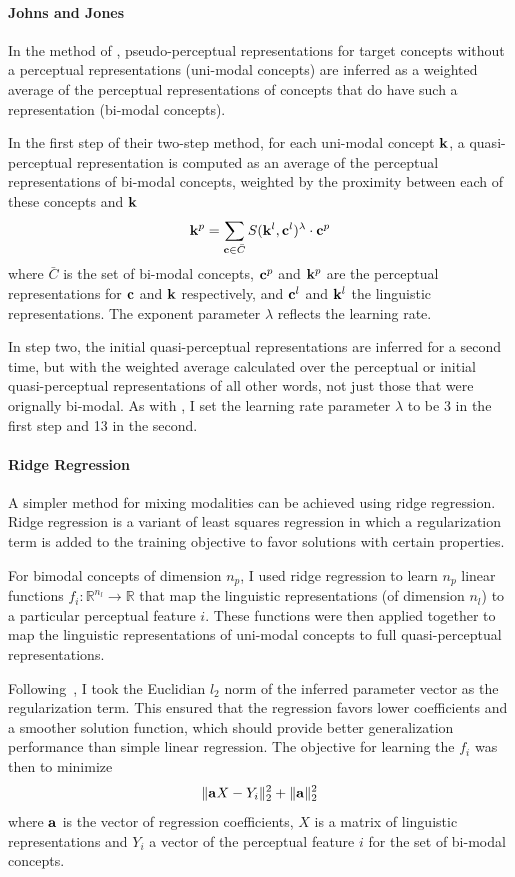 \paragraph{Johns and Jones} In the method of \cite{johns2012perceptual}, pseudo-perceptual representations for target concepts without a perceptual representations (uni-modal concepts) are inferred as a weighted average of the perceptual representations of concepts that do have such a representation (bi-modal concepts). 

In the first step of their two-step method, for each uni-modal concept  \(\bf k\), a quasi-perceptual representation is computed as an average of the perceptual representations of bi-modal concepts, weighted by the proximity between each of these concepts and \( \bf k\)\[{\bf k}^p = \sum_{{\bf c} \in \bar{C}} S({\bf k}^l,{\bf c}^l)^\lambda \cdot {\bf c}^p  \] where \(  \bar{C} \) is the set of bi-modal concepts, \({\bf c}^p\) and  \({\bf k}^p\) are the perceptual representations for \(\bf c\) and \(\bf k\) respectively, and  \({\bf c}^l\) and \({\bf k}^l\) the linguistic representations. The exponent parameter \(\lambda \) reflects the learning rate. 

In step two, the initial quasi-perceptual representations are inferred for a second time, but with the weighted average calculated over the perceptual or initial quasi-perceptual representations of all other words, not just those that were orignally bi-modal. As with \cite{johns2012perceptual}, I set the learning rate parameter \( \lambda\) to be 3 in the first step and 13 in the second.  


\paragraph{Ridge Regression} A simpler method for mixing modalities can be achieved using ridge regression. Ridge regression is a variant of least squares regression in which a regularization term is added to the training objective to favor solutions with certain properties. 

For bimodal concepts of dimension \(n_p\), I used ridge regression to learn \(n_p\) linear functions \( f_i: \mathbb{R}^{n_l} \to \mathbb{R} \) that map the linguistic representations (of dimension \(n_l\)) to a particular perceptual feature \(i\). These functions were then applied together to map the linguistic representations of uni-modal concepts to full quasi-perceptual representations.

Following~\cite{hill2014multi}, I took the Euclidian \( l_2 \) norm of the inferred parameter vector as the regularization term. This ensured that the regression favors lower coefficients and a smoother solution function, which should provide better generalization performance than simple linear regression. The objective for learning the \( f_i \) was then to minimize \[ \| {\bf a}X - Y_i \|_2^2 + \|{\bf a}\|_2^2 \] where \( {\bf a}\) is the vector of regression coefficients, \( X \) is a matrix of linguistic representations and \(  Y_i \) a vector of the perceptual feature \(i\) for the set of bi-modal concepts.

